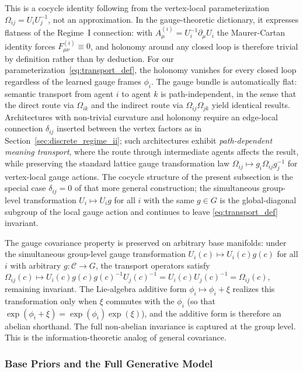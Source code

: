 \documentclass[11pt]{article}
\begin{document}
This is a cocycle identity following from the vertex-local parameterization $\Omega_{ij} = U_iU_j^{-1}$, not an approximation. In the gauge-theoretic dictionary, it expresses flatness of the Regime~I connection: with $A^{(i)}_\mu = U_i^{-1}\partial_\mu U_i$ the Maurer-Cartan identity forces $F^{(i)}_{\mu\nu} \equiv 0$, and holonomy around any closed loop is therefore trivial by definition rather than by deduction. For our parameterization~\eqref{eq:transport_def}, the holonomy vanishes for every closed loop regardless of the learned gauge frames $\phi_i$. The gauge bundle is automatically flat: semantic transport from agent $i$ to agent $k$ is path-independent, in the sense that the direct route via $\Omega_{ik}$ and the indirect route via $\Omega_{ij}\Omega_{jk}$ yield identical results. Architectures with non-trivial curvature and holonomy require an edge-local connection $\delta_{ij}$ inserted between the vertex factors as in Section~\ref{sec:discrete_regime_ii}; such architectures exhibit \emph{path-dependent meaning transport}, where the route through intermediate agents affects the result, while preserving the standard lattice gauge transformation law $\Omega_{ij} \mapsto g_i \Omega_{ij} g_j^{-1}$ for vertex-local gauge actions. The cocycle structure of the present subsection is the special case $\delta_{ij} = 0$ of that more general construction; the simultaneous group-level transformation $U_i \mapsto U_i g$ for all $i$ with the same $g \in G$ is the global-diagonal subgroup of the local gauge action and continues to leave \eqref{eq:transport_def} invariant.

The gauge covariance property is preserved on arbitrary base manifolds: under the simultaneous group-level gauge transformation $U_i(c) \mapsto U_i(c) g(c)$ for all $i$ with arbitrary $g: \mathcal{C} \to G$, the transport operators satisfy $\Omega_{ij}(c) \mapsto U_i(c) g(c) g(c)^{-1} U_j(c)^{-1} = U_i(c) U_j(c)^{-1} = \Omega_{ij}(c)$, remaining invariant. The Lie-algebra additive form $\phi_i \mapsto \phi_i + \xi$ realizes this transformation only when $\xi$ commutes with the $\phi_i$ (so that $\exp(\phi_i + \xi) = \exp(\phi_i)\exp(\xi)$), and the additive form is therefore an abelian shorthand. The full non-abelian invariance is captured at the group level. This is the information-theoretic analog of general covariance.

\subsubsection{Base Priors and the Full Generative Model}
\end{document}
